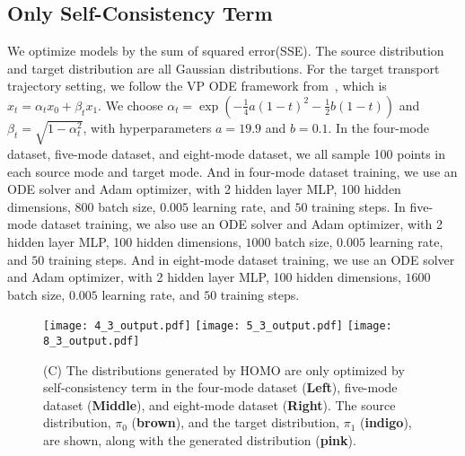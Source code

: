 \subsection{Only Self-Consistency Term}\label{sec:app:self_consistency}
We optimize models by the sum of squared error(SSE). The source distribution and target distribution are all Gaussian distributions. For the target transport trajectory setting, we follow the VP ODE framework from~\cite{rectified_flow}, which is $x_t = \alpha_t x_0 + \beta_t x_1$. We choose $\alpha_t = \exp(-\frac{1}{4} a(1-t)^2 - \frac{1}{2} b(1-t))$ and $\beta_t = \sqrt{1 - \alpha_t^2}$, with hyperparameters $a = 19.9$ and $b = 0.1$. In the four-mode dataset, five-mode dataset, and eight-mode dataset, we all sample 100 points in each source mode and target mode. And in four-mode dataset training, we use an ODE solver and Adam optimizer, with 2 hidden layer MLP, 100 hidden dimensions, $800$ batch size, $0.005$ learning rate, and $50$ training steps. In five-mode dataset training, we also use an ODE solver and Adam optimizer, with 2 hidden layer MLP, 100 hidden dimensions, $1000$ batch size, $0.005$ learning rate, and $50$ training steps. And in eight-mode dataset training, we use an ODE solver and Adam optimizer, with 2 hidden layer MLP, 100 hidden dimensions, $1600$ batch size, $0.005$ learning rate, and $50$ training steps. 
\begin{figure}[!ht]
\centering
\texttt{[image: 4\_3\_output.pdf]}
\texttt{[image: 5\_3\_output.pdf]}
\texttt{[image: 8\_3\_output.pdf]}
\caption{
(C) The distributions generated by HOMO are only optimized by self-consistency term in the four-mode dataset (\textbf{Left}), five-mode dataset (\textbf{Middle}), and eight-mode dataset (\textbf{Right}). 
The source distribution, $\pi_0$ ({\textbf{brown}}), and the target distribution, $\pi_1$ ({\textbf{indigo}}), are shown, along with the generated distribution ({\textbf{pink}}). 
}
\label{fig:3_distribution}
\end{figure}

